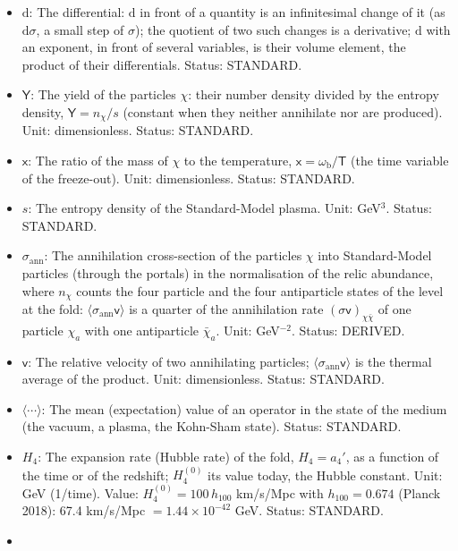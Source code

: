 \documentclass[
  10pt,
]{article}
\providecommand{\tightlist}{%
  \setlength{\itemsep}{0pt}\setlength{\parskip}{0pt}}
\begin{document}
\begin{itemize}
\tightlist
\item
  \(\mathrm{d}\): The differential: \(\mathrm{d}\) in front of a
  quantity is an infinitesimal change of it (as \(\mathrm{d}\sigma\), a
  small step of \(\sigma\)); the quotient of two such changes is a
  derivative; \(\mathrm{d}\) with an exponent, in front of several
  variables, is their volume element, the product of their
  differentials. Status: STANDARD.
\item
  \(\mathsf{Y}\): The yield of the particles \(\chi\): their number
  density divided by the entropy density, \(\mathsf{Y} = n_\chi/s\)
  (constant when they neither annihilate nor are produced). Unit:
  dimensionless. Status: STANDARD.
\item
  \(\mathsf{x}\): The ratio of the mass of \(\chi\) to the temperature,
  \(\mathsf{x} = \omega_{\mathrm{b}}/\mathsf{T}\) (the time variable of
  the freeze-out). Unit: dimensionless. Status: STANDARD.
\item
  \(s\): The entropy density of the Standard-Model plasma. Unit:
  GeV\(^3\). Status: STANDARD.
\item
  \(\sigma_{\mathrm{ann}}\): The annihilation cross-section of the
  particles \(\chi\) into Standard-Model particles (through the portals)
  in the normalisation of the relic abundance, where \(n_\chi\) counts
  the four particle and the four antiparticle states of the level at the
  fold: \(\langle\sigma_{\mathrm{ann}}\mathsf{v}\rangle\) is a quarter
  of the annihilation rate \((\sigma\mathsf{v})_{\chi\bar\chi}\) of one
  particle \(\chi_a\) with one antiparticle \(\bar\chi_a\). Unit:
  GeV\(^{-2}\). Status: DERIVED.
\item
  \(\mathsf{v}\): The relative velocity of two annihilating particles;
  \(\langle\sigma_{\mathrm{ann}}\mathsf{v}\rangle\) is the thermal
  average of the product. Unit: dimensionless. Status: STANDARD.
\item
  \(\langle\cdots\rangle\): The mean (expectation) value of an operator
  in the state of the medium (the vacuum, a plasma, the Kohn-Sham
  state). Status: STANDARD.
\item
  \(H_4\): The expansion rate (Hubble rate) of the fold, \(H_4 = a_4'\),
  as a function of the time or of the redshift; \(H_4^{(0)}\) its value
  today, the Hubble constant. Unit: GeV (1/time). Value:
  \(H_4^{(0)} = 100\,h_{100}\) km/s/Mpc with \(h_{100} = 0.674\) (Planck
  2018): 67.4 km/s/Mpc \(= 1.44\times10^{-42}\) GeV. Status: STANDARD.
\item

\end{itemize}
\end{document}
